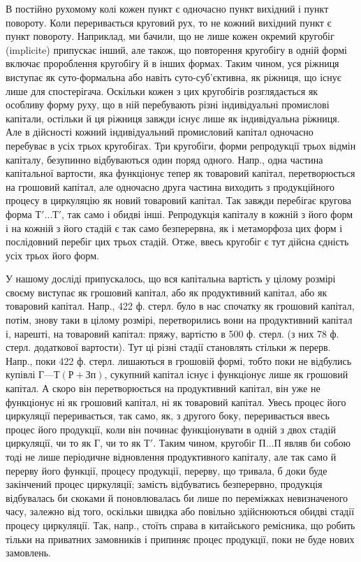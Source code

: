 В постійно рухомому колі кожен пункт є одночасно пункт вихідний
і пункт повороту. Коли переривається круговий рух, то не кожний
вихідний пункт є пункт повороту. Наприклад, ми бачили, що не лише
кожен окремий кругобіг (implicite) припускає інший, але також, що
повторення кругобігу в одній формі включає пророблення кругобігу й
в інших формах. Таким чином, уся ріжниця виступає як суто-формальна
або навіть суто-суб’єктивна, як ріжниця, що існує лише для спостерігача.
Оскільки кожен з цих кругобігів розглядається як особливу форму
руху, що в ній перебувають різні індивідуальні промислові капітали, остільки
й ця ріжниця завжди існує лише як індивідуальна ріжниця. Але в дійсності
кожний індивідуальний промисловий капітал одночасно перебуває
в усіх трьох кругобігах. Три кругобіги, форми репродукції трьох відмін
капіталу, безупинно відбуваються один поряд одного. Напр., одна частина
капітальної вартости, яка функціонує тепер як товаровий капітал, перетворюється
на грошовий капітал, але одночасно друга частина виходить
з продукційного процесу в циркуляцію як новий товаровий капітал. Так
завжди перебігає кругова форма $Т'\dots{} Т'$, так само і обидві інші. Репродукція
капіталу в кожній з його форм і на кожній з його стадій
є так само безперервна, як і метаморфоза цих форм і послідовний перебіг
цих трьох стадій. Отже, ввесь кругобіг є тут дійсна єдність усіх трьох
його форм.

У нашому досліді припускалось, що вся капітальна вартість у цілому розмірі
своєму виступає як грошовий капітал, або як продуктивний капітал, або як
товаровий капітал. Напр., 422 ф. стерл. було в нас спочатку як грошовий
капітал, потім, знову таки в цілому розмірі, перетворились вони на
продуктивний капітал і, нарешті, на товаровий капітал: пряжу, вартістю
в 500 ф. стерл. (з них 78 ф. стерл. додаткової вартости). Тут ці різні
стадії становлять стільки ж перерв. Напр., поки 422 ф. стерл. лишаються
в грошовій формі, тобто поки не відбулись купівлі $Г — Т (Р + Зп)$,
сукупний капітал існує і функціонує лише як грошовий капітал. А скоро
він перетворюється на продуктивний капітал, він уже не функціонує ні
як грошовий капітал, ні як товаровий капітал. Увесь процес його циркуляції
переривається, так само, як, з другого боку, переривається ввесь
процес його продукції, коли він починає функціонувати в одній з двох
стадій циркуляції, чи то як $Г$, чи то як $Т'$. Таким чином, кругобіг $П\dots{} П$
являв би собою тоді не лише періодичне відновлення продуктивного
капіталу, але так само й перерву його функції, процесу продукції, перерву,
що тривала, б доки буде закінчений процес циркуляції; замість відбуватись
безперервно, продукція відбувалась би скоками й поновлювалась би лише
по переміжках невизначеного часу, залежно від того, оскільки швидка
або повільно здійснюються обидві стадії процесу циркуляції. Так, напр.,
стоїть справа в китайського ремісника, що робить тільки на приватних
замовників і припиняє процес продукції, поки не буде нових замовлень.

